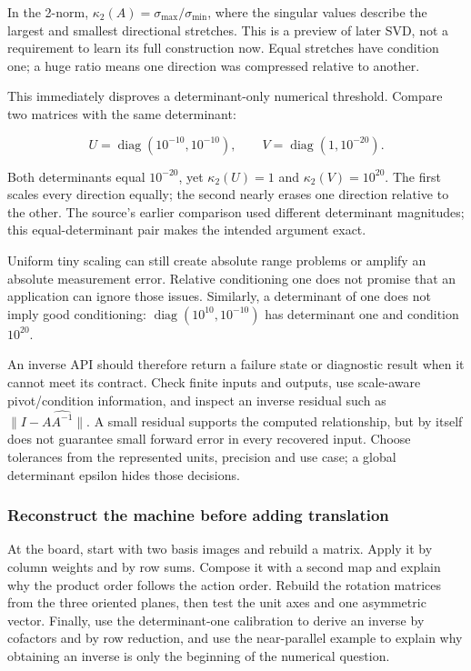 In the 2-norm, \(\kappa_2(A)=\sigma_{\max}/\sigma_{\min}\), where the singular values describe the largest and smallest directional stretches. This is a preview of later SVD, not a requirement to learn its full construction now. Equal stretches have condition one; a huge ratio means one direction was compressed relative to another.

This immediately disproves a determinant-only numerical threshold. Compare two matrices with the same determinant:

\[
U=\operatorname{diag}(10^{-10},10^{-10}),\qquad
V=\operatorname{diag}(1,10^{-20}).
\]

Both determinants equal \(10^{-20}\), yet \(\kappa_2(U)=1\) and \(\kappa_2(V)=10^{20}\). The first scales every direction equally; the second nearly erases one direction relative to the other. The source's earlier comparison used different determinant magnitudes; this equal-determinant pair makes the intended argument exact.

Uniform tiny scaling can still create absolute range problems or amplify an absolute measurement error. Relative conditioning one does not promise that an application can ignore those issues. Similarly, a determinant of one does not imply good conditioning: \(\operatorname{diag}(10^{10},10^{-10})\) has determinant one and condition \(10^{20}\).

An inverse API should therefore return a failure state or diagnostic result when it cannot meet its contract. Check finite inputs and outputs, use scale-aware pivot/condition information, and inspect an inverse residual such as \(\|I-A\widehat{A^{-1}}\|\). A small residual supports the computed relationship, but by itself does not guarantee small forward error in every recovered input. Choose tolerances from the represented units, precision and use case; a global determinant epsilon hides those decisions.

\subsubsection{Reconstruct the machine before adding translation}\label{01-foundations-i-ch018-reconstruct-the-machine-before-adding-translation}

\hypertarget{01-foundations-i-ch018-reconstruct-the-machine-before-adding-translation}{}

At the board, start with two basis images and rebuild a matrix. Apply it by column weights and by row sums. Compose it with a second map and explain why the product order follows the action order. Rebuild the rotation matrices from the three oriented planes, then test the unit axes and one asymmetric vector. Finally, use the determinant-one calibration to derive an inverse by cofactors and by row reduction, and use the near-parallel example to explain why obtaining an inverse is only the beginning of the numerical question.

